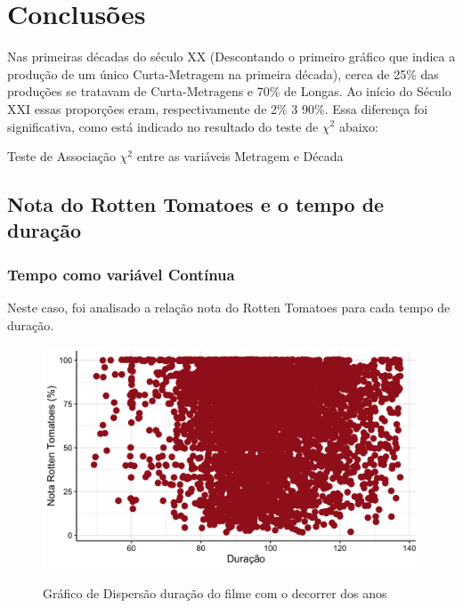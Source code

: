 \documentclass[a4paper, 12pt]{article} %
\begin{document}
\section{Conclusões}

Nas primeiras décadas do século XX (Descontando o primeiro gráfico que indica a produção de um único Curta-Metragem na primeira década), cerca de 25\% das produções se tratavam de Curta-Metragens e 70\% de Longas. Ao início do Século XXI essas proporções eram, respectivamente de 2\% 3 90\%. Essa diferença foi significativa, como está indicado no resultado do teste de $\chi^2$ abaixo:

\begin{quadro}[H]
\centering
\caption{Teste de Associação $\chi^2$ entre as variáveis Metragem e Década }
\label{R-Q-Teste-1}
\vspace{0.1cm}
\end{quadro}

\subsection{Nota do Rotten Tomatoes e o tempo de duração}

\subsubsection{Tempo como variável Contínua}

Neste caso, foi analisado a relação nota  do Rotten Tomatoes para cada tempo de duração. 
 
\begin{figure}[H]
    \centering
    \caption{Gráfico de Dispersão duração do filme com o decorrer dos anos}
    \includegraphics[scale=0.15]{Fig_Rotten_Duracao.png}
    \label{fig:my_label}
\end{figure}
\end{document}
